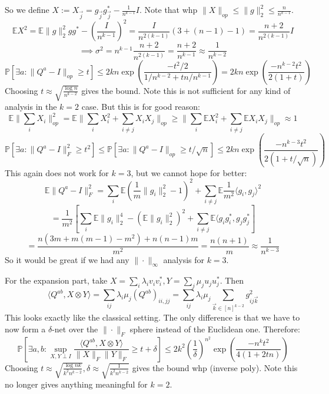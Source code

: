 \documentclass{article}
\newcommand{\E}{\mathbb{E}}
\renewcommand{\Pr}{\mathbb{P}}
\begin{document}
So we define $X := X_{\vec{j}} = g_{\vec{j}} g_{\vec{j}}^{*} - \frac{1}{n^{k-1}} I$. Note that whp $\|X\|_{op} \leq \|g\|_{2}^{2} \leq \frac{n}{n^{k-1}}$. 
\[ \E X^{2} = \E \|g\|_{2}^{2} g g^{*} - \left( \frac{I}{n^{k-1}} \right)^{2} = \frac{I}{n^{2(k-1)}} (3 + (n-1) - 1) = \frac{n+2}{n^{2(k-1)}} I  \]
\[ \implies \sigma^{2} = n^{k-1} \frac{n+2}{n^{2(k-1)}} = \frac{n+2}{n^{k-1}} \approx \frac{1}{n^{k-2}}  \]
\[ \Pr [ \exists a: \|Q^{a} - I\|_{op} \geq t ] \leq 2 k n \exp \left( \frac{-t^{2}/2}{1/n^{k-2} + t n/ n^{k-1}}  \right) = 2 k n \exp \left( \frac{- n^{k-2} t^{2}}{2(1 + t)} \right)  \]
Choosing $t \approx \sqrt{\frac{\log n}{n^{k-2}}}$ gives the bound. Note this is not sufficient for any kind of analysis in the $k=2$ case. But this is for good reason:
\[ \E \|\sum_{i} X_{i}\|_{op}^{2} = \E \|\sum_{i} X_{i}^{2} + \sum_{i \neq j} X_{i} X_{j}\|_{op} \geq \|\sum_{i} \E X_{i}^{2} + \sum_{i \neq j} \E X_{i} X_{j} \|_{op} \approx 1   \]
\[ \Pr [ \exists a: \|Q^{a} - I\|_{F}^{2} \geq t^{2} ] \leq \Pr [ \exists a: \|Q^{a} - I\|_{op} \geq t/\sqrt{n} ] \leq 2kn \exp\left(\frac{-n^{k-3} t^{2}}{2(1+t/\sqrt{n})} \right) \]
This again does not work for $k=3$, but we cannot hope for better:
\[ \E\|Q^{a} - I\|_{F}^{2} = \sum_{i} \E (\frac{1}{m} \|g_{i}\|_{2}^{2} - 1)^{2} + \sum_{i \neq j} \E \frac{1}{m^{2}} \langle g_{i}, g_{j} \rangle^{2} \]
\[ = \frac{1}{m^{2}} [ \sum_{i} \E \|g_{i}\|_{2}^{4} - (\E \|g_{i}\|_{2}^{2})^{2} + \sum_{i \neq j} \E \langle g_{i} g_{i}^{*}, g_{j} g_{j}^{*} ] \]
\[ = \frac{n(3m + m(m-1) - m^{2}) + n(n-1)m}{m^{2}} = \frac{n(n+1)}{m} \approx \frac{1}{n^{k-3}}
\]
So it would be great if we had any $\|\cdot\|_{\infty}$ analysis for $k=3$. 


For the expansion part, take $X = \sum_{i} \lambda_{i} v_{i} v_{i}^{*}, Y = \sum_{j} \mu_{j} u_{j} u_{j}^{*}$. Then 
\[ \langle Q^{ab}, X \otimes Y \rangle = \sum_{ij} \lambda_{i} \mu_{j} (Q^{ab})_{ii,jj} = \sum_{ij} \lambda_{i} \mu_{j} \sum_{\vec{k} \in [n]^{k-2}} g_{ij\vec{k}}^{2}   \]
This looks exactly like the classical setting. The only difference is that we have to now form a $\delta$-net over the $\|\cdot\|_{F}$ sphere instead of the Euclidean one. Therefore:
\[ \Pr [ \exists a,b:  \sup_{X,Y \perp I} \frac{\langle Q^{ab}, X \otimes Y \rangle}{\|X\|_{F} \|Y\|_{F}} \geq t + \delta ] \leq 2 k^{2} \left( \frac{1}{\delta} \right)^{n^{2}} \exp \left( \frac{- n^{k} t^{2}}{4(1 + 2tn)} \right)    \]
Choosing $t \approx \sqrt{\frac{\log nk}{k^{2} n^{k-2}}}, \delta \approx \sqrt{\frac{1}{k^{2} n^{k-2}}}$ gives the bound whp (inverse poly). Note this no longer gives anything meaningful for $k=2$. 
\end{document}
